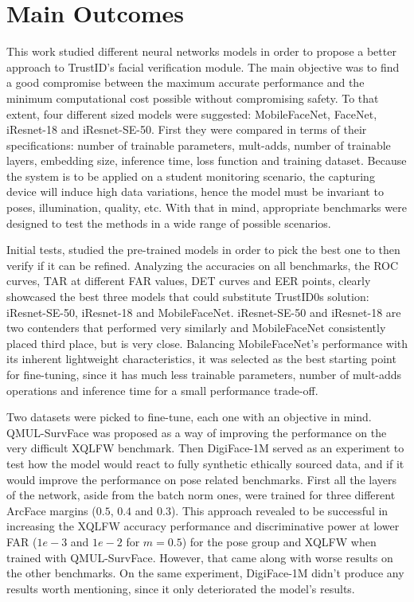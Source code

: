 \documentclass[class=report, crop=false, a4paper, 12pt]{standalone}
\begin{document}
\section{Main Outcomes}
\par This work studied different neural networks models in order to propose a better approach to TrustID's facial verification module. The main objective was to find a good compromise between the maximum accurate performance and the minimum computational cost possible without compromising safety. To that extent, four different sized models were suggested: MobileFaceNet, FaceNet, iResnet-18 and iResnet-SE-50. First they were compared in terms of their specifications: number of trainable parameters, mult-adds, number of trainable layers, embedding size, inference time, loss function and training dataset. Because the system is to be applied on a student monitoring scenario, the capturing device will induce high data variations, hence the model must be invariant to poses, illumination, quality, etc. With that in mind, appropriate benchmarks were designed to test the methods in a wide range of possible scenarios.

\par Initial tests, studied the pre-trained models in order to pick the best one to then verify if it can be refined. Analyzing the accuracies on all benchmarks, the ROC curves, TAR at different FAR values, DET curves and EER points, clearly showcased the best three models that could substitute TrustID0s solution: iResnet-SE-50, iResnet-18 and MobileFaceNet. iResnet-SE-50 and iResnet-18 are two contenders that performed very similarly and MobileFaceNet consistently placed third place, but is very close. Balancing MobileFaceNet's performance with its inherent lightweight characteristics, it was selected as the best starting point for fine-tuning, since it has much less trainable parameters, number of mult-adds operations and inference time for a small performance trade-off.

\par Two datasets were picked to fine-tune, each one with an objective in mind. QMUL-SurvFace was proposed as a way of improving the performance on the very difficult XQLFW benchmark. Then DigiFace-1M served as an experiment to test how the model would react to fully synthetic ethically sourced data, and if it would improve the performance on pose related benchmarks. First all the layers of the network, aside from the batch norm ones, were trained for three different ArcFace margins ($0.5$, $0.4$ and $0.3$). This approach revealed to be successful in increasing the XQLFW accuracy performance and discriminative power at lower FAR ($1e-3$ and $1e-2$ for $m=0.5$) for the pose group and XQLFW when trained with QMUL-SurvFace. However, that came along with worse results on the other benchmarks. On the same experiment, DigiFace-1M didn't produce any results worth mentioning, since it only deteriorated the model's results.  
\end{document}
